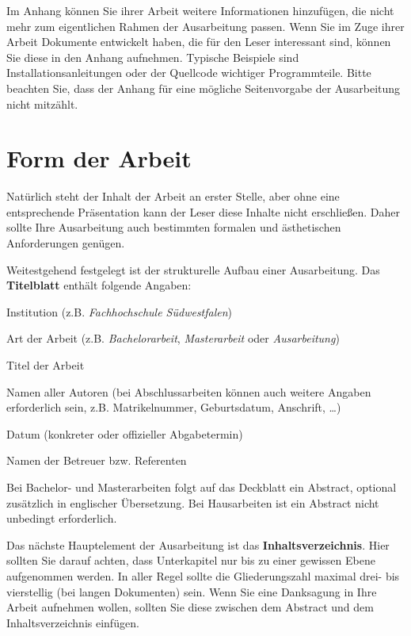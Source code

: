 Im Anhang können Sie ihrer Arbeit weitere Informationen hinzufügen, die nicht mehr zum eigentlichen Rahmen der Ausarbeitung passen.
Wenn Sie im Zuge ihrer Arbeit Dokumente entwickelt haben, die für den Leser interessant sind, können Sie diese in den Anhang aufnehmen.
Typische Beispiele sind Installationsanleitungen oder der Quellcode wichtiger Programmteile.
Bitte beachten Sie, dass der Anhang für eine mögliche Seitenvorgabe der Ausarbeitung nicht mitzählt.

\section{Form der Arbeit}

Natürlich steht der Inhalt der Arbeit an erster Stelle, aber ohne eine entsprechende Präsentation kann der Leser diese Inhalte nicht erschließen.
Daher sollte Ihre Ausarbeitung auch bestimmten formalen und ästhetischen Anforderungen genügen.

Weitestgehend festgelegt ist der strukturelle Aufbau einer Ausarbeitung.
Das \textbf{Titelblatt} enthält folgende Angaben:
\begin{compactitem}
\item Institution (z.B. \textit{Fachhochschule Südwestfalen})
\item Art der Arbeit (z.B. \textit{Bachelorarbeit}, \textit{Masterarbeit} oder \textit{Ausarbeitung})
\item Titel der Arbeit
\item Namen aller Autoren (bei Abschlussarbeiten können auch weitere Angaben erforderlich sein, z.B. Matrikelnummer, Geburtsdatum, Anschrift, \dots)
\item Datum (konkreter oder offizieller Abgabetermin)
\item Namen der Betreuer bzw. Referenten
\end{compactitem}

Bei Bachelor- und Masterarbeiten folgt auf das Deckblatt ein Abstract, optional zusätzlich in englischer Übersetzung.
Bei Hausarbeiten ist ein Abstract nicht unbedingt erforderlich.

Das nächste Hauptelement der Ausarbeitung ist das \textbf{Inhaltsverzeichnis}.
Hier sollten Sie darauf achten, dass Unterkapitel nur bis zu einer gewissen Ebene aufgenommen werden.
In aller Regel sollte die Gliederungszahl maximal drei- bis vierstellig (bei langen Dokumenten) sein.
Wenn Sie eine Danksagung in Ihre Arbeit aufnehmen wollen, sollten Sie diese zwischen dem Abstract und dem Inhaltsverzeichnis einfügen.

